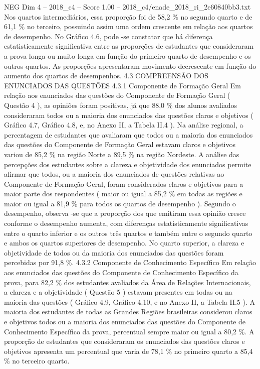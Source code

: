 \begin{textsample}{NEG Dim 4 – 2018\_c4 – Score 1.00 – 2018\_c4/enade\_2018\_ri\_2e60840bb3.txt}
Nos quartos intermediários, essa proporção foi de 58,2 \% no segundo quarto e de 61,1 \% no terceiro, possuindo assim uma ordem crescente em relação aos quartos de desempenho.
No Gráfico 4.6, pode -se constatar que há diferença estatisticamente significativa entre as proporções de estudantes que consideraram a prova longa ou muito longa em função do primeiro quarto de desempenho e os outros quartos.
As proporções apresentaram movimento decrescente em função do aumento dos quartos de desempenhos. 4.3 COMPREENSÃO DOS ENUNCIADOS DAS QUESTÕES 4.3.1 Componente de Formação Geral Em relação aos enunciados das questões do Componente de Formação Geral ( Questão 4 ), as opiniões foram positivas, já que 88,0 \% dos alunos avaliados consideraram todos ou a maioria dos enunciados das questões claros e objetivos ( Gráfico 4.7, Gráfico 4.8, e, no Anexo II, a Tabela II.4 ).
Na análise regional, a percentagem de estudantes que avaliaram que todos ou a maioria dos enunciados das questões do Componente de Formação Geral estavam claros e objetivos variou de 85,2 \% na região Norte a 89,5 \% na região Nordeste.
A análise das percepções dos estudantes sobre a clareza e objetividade dos enunciados permite afirmar que todos, ou a maioria dos enunciados de questões relativas ao Componente de Formação Geral, foram considerados claros e objetivos para a maior parte dos respondentes ( maior ou igual a 85,2 \% em todas as regiões e maior ou igual a 81,9 \% para todos os quartos de desempenho ).
Segundo o desempenho, observa -se que a proporção dos que emitiram essa opinião cresce conforme o desempenho aumenta, com diferenças estatisticamente significativas entre o quarto inferior e os outros três quartos e também entre o segundo quarto e ambos os quartos superiores de desempenho.
No quarto superior, a clareza e objetividade de todos ou da maioria dos enunciados das questões foram percebidas por 91,8 \%. 4.3.2 Componente de Conhecimento Específico Em relação aos enunciados das questões do Componente de Conhecimento Específico da prova, para 82,2 \% dos estudantes avaliados da Área de Relações Internacionais, a clareza e a objetividade ( Questão 5 ) estavam presentes em todas ou na maioria das questões ( Gráfico 4.9, Gráfico 4.10, e no Anexo II, a Tabela II.5 ).
A maioria dos estudantes de todas as Grandes Regiões brasileiras considerou claros e objetivos todos ou a maioria dos enunciados das questões do Componente de Conhecimento Específico da prova, percentual sempre maior ou igual a 80,2 \%.
A proporção de estudantes que consideraram os enunciados das questões claros e objetivos apresenta um percentual que varia de 78,1 \% no primeiro quarto a 85,4 \% no terceiro quarto.

\end{textsample}
